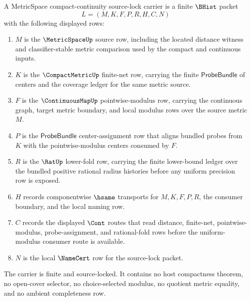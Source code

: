\begin{definition}
\label{def:metricspace-compact-continuity-source-lock}
A MetricSpace compact-continuity source-lock carrier is a finite $\BHist$ packet
$$
L=(M,K,F,P,R,H,C,N)
$$
with the following displayed rows:
\begin{enumerate}
\item $M$ is the $\MetricSpaceUp$ source row, including the located distance witness and classifier-stable metric comparison used by the compact and continuous inputs.
\item $K$ is the $\CompactMetricUp$ finite-net row, carrying the finite $\mathsf{ProbeBundle}$ of centers and the coverage ledger for the same metric source.
\item $F$ is the $\ContinuousMapUp$ pointwise-modulus row, carrying the continuous graph, target metric boundary, and local modulus rows over the source metric $M$.
\item $P$ is the $\mathsf{ProbeBundle}$ center-assignment row that aligns bundled probes from $K$ with the pointwise-modulus centers consumed by $F$.
\item $R$ is the $\RatUp$ lower-fold row, carrying the finite lower-bound ledger over the bundled positive rational radius histories before any uniform precision row is exposed.
\item $H$ records componentwise $\hsame$ transports for $M,K,F,P,R$, the consumer boundary, and the local naming row.
\item $C$ records the displayed $\Cont$ routes that read distance, finite-net, pointwise-modulus, probe-assignment, and rational-fold rows before the uniform-modulus consumer route is available.
\item $N$ is the local $\NameCert$ row for the source-lock packet.
\end{enumerate}
The carrier is finite and source-locked. It contains no host compactness theorem, no open-cover selector, no choice-selected modulus, no quotient metric equality, and no ambient completeness row.
\end{definition}

